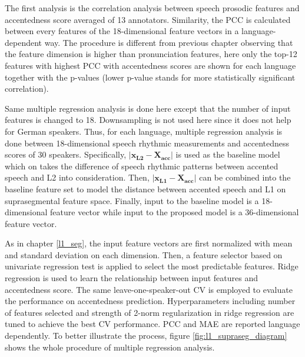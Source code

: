 The first analysis is the correlation analysis between speech prosodic features and accentedness score averaged of 13 annotators. Similarity, the PCC is calculated between every features of the 18-dimensional feature vectors in a language-dependent way. The procedure is different from previous chapter observing that the feature dimension is higher than pronunciation features, here only the top-12 features with highest PCC with accentedness scores are shown for each language together with the p-values (lower p-value stands for more statistically significant correlation).

Same multiple regression analysis is done here except that the number of input features is changed to 18. Downsampling is not used here since it does not help for German speakers. Thus, for each language, multiple regression analysis is done between 18-dimensional speech rhythmic measurements and accentedness  scores of 30 speakers. Specifically, $\left| \mathbf{x_{L2}}-\mathbf{X_{acc}} \right|$ is used as the baseline model which on takes the difference of speech rhythmic patterns between accented speech and L2 into consideration. Then, $\left| \mathbf{x_{L1}}- \mathbf{X_{acc}} \right|$ can be combined into the baseline feature set to model the distance between accented speech and L1 on suprasegmental feature space. Finally, input to the baseline model is a 18-dimensional feature vector while input to the proposed model is a 36-dimensional feature vector.

As in chapter \ref{l1_seg}, the input feature vectors are first normalized with mean and standard deviation on each dimension. Then, a feature selector based on univariate regression test is applied to select the most predictable features. Ridge regression is used to learn the relationship between input features and accentedness score. The same leave-one-speaker-out CV is employed to evaluate the performance on accentedness prediction. Hyperparameters including number of features selected and strength of 2-norm regularization in ridge regression are tuned to achieve the best CV performance. PCC and MAE are reported language dependently. To better illustrate the process, figure \ref{fig:l1_supraseg_diagram} shows the whole procedure of multiple regression analysis.

